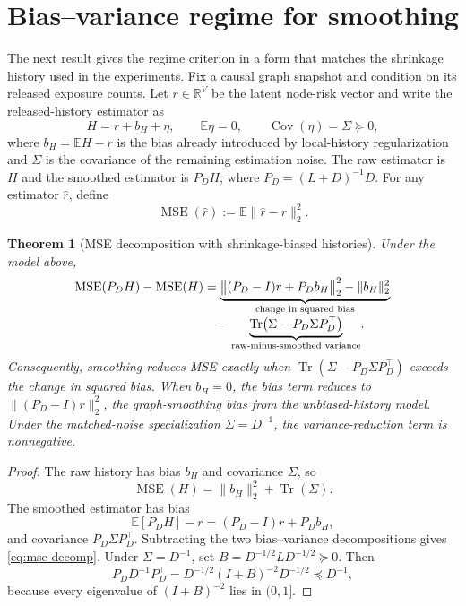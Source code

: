 \documentclass[11pt]{article}
\newtheorem{theorem}{Theorem}[section]
\theoremstyle{definition}
\theoremstyle{remark}
\newcommand{\R}{\mathbb{R}}
\newcommand{\E}{\mathbb{E}}
\newcommand{\Cov}{\operatorname{Cov}}
\newcommand{\Tr}{\operatorname{Tr}}
\begin{document}
\section{Bias--variance regime for smoothing}
\label{sec:mse}

The next result gives the regime criterion in a form that matches the shrinkage history used in the experiments. Fix a causal graph snapshot and condition on its released exposure counts. Let $r\in\R^V$ be the latent node-risk vector and write the released-history estimator as
\[
    H=r+b_H+\eta,
    \qquad
    \E\eta=0,
    \qquad
    \Cov(\eta)=\Sigma\succeq0,
\]
where $b_H=\E H-r$ is the bias already introduced by local-history regularization and $\Sigma$ is the covariance of the remaining estimation noise. The raw estimator is $H$ and the smoothed estimator is $P_DH$, where $P_D=(L+D)^{-1}D$. For any estimator $\widehat r$, define
\[
    \operatorname{MSE}(\widehat r):=\E\|\widehat r-r\|_2^2.
\]

\begin{theorem}[MSE decomposition with shrinkage-biased histories]
\label{thm:mse-decomp}
Under the model above,
\begin{align}
    \operatorname{MSE}(P_DH)-\operatorname{MSE}(H)
    &={\underbrace{\bigl\|(P_D-I)r+P_Db_H\bigr\|_2^2-\|b_H\|_2^2}_{\text{change in squared bias}}}
    \notag\\[-0.25em]
    &\quad-{\underbrace{\Tr\!\left(\Sigma-P_D\Sigma P_D^\top\right)}_{\text{raw-minus-smoothed variance}}}.
    \label{eq:mse-decomp}
\end{align}
Consequently, smoothing reduces MSE exactly when
$\Tr(\Sigma-P_D\Sigma P_D^\top)$ exceeds the change in squared bias. When $b_H=0$, the bias term reduces to $\|(P_D-I)r\|_2^2$, the graph-smoothing bias from the unbiased-history model. Under the matched-noise specialization $\Sigma=D^{-1}$, the variance-reduction term is nonnegative.
\end{theorem}

\begin{proof}
The raw history has bias $b_H$ and covariance $\Sigma$, so
\[
    \operatorname{MSE}(H)=\|b_H\|_2^2+\Tr(\Sigma).
\]
The smoothed estimator has bias
\[
    \E[P_DH]-r=(P_D-I)r+P_Db_H,
\]
and covariance $P_D\Sigma P_D^\top$. Subtracting the two bias--variance decompositions gives \eqref{eq:mse-decomp}. Under $\Sigma=D^{-1}$, set $B=D^{-1/2}LD^{-1/2}\succeq0$. Then
\[
    P_DD^{-1}P_D^\top
    =D^{-1/2}(I+B)^{-2}D^{-1/2}\preceq D^{-1},
\]
because every eigenvalue of $(I+B)^{-2}$ lies in $(0,1]$.
\end{proof}
\end{document}
